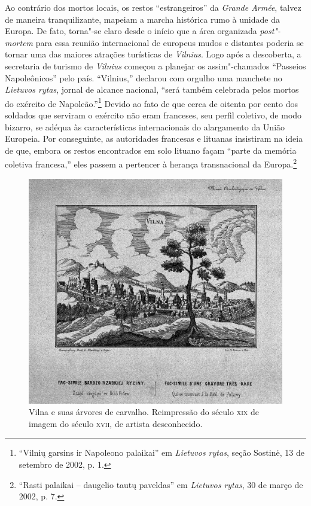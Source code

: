 Ao contrário dos mortos locais, os restos ``estrangeiros'' da
\textit{Grande Armée}, talvez de maneira tranquilizante, mapeiam a marcha
histórica rumo à unidade da Europa. De fato, torna"-se claro desde o
início que a área organizada \textit{post"-mortem} para essa reunião
internacional de europeus mudos e distantes poderia se tornar uma das
maiores atrações turísticas de \textit{Vilnius}. Logo após a descoberta, a
secretaria de turismo de \textit{Vilnius} começou a planejar os assim"-chamados
``Passeios Napoleônicos'' pelo país. ``Vilnius,'' declarou com orgulho
uma manchete no \textit{Lietuvos rytas}, jornal de alcance nacional,
``será também celebrada pelos mortos do exército de
Napoleão.''\footnote{``Vilnių garsins ir Napoleono palaikai'' em \textit{Lietuvos rytas}, seção Sostinė, 13 de setembro de 2002, p. 1.} Devido ao fato de que cerca de oitenta por cento dos soldados que
serviram o exército não eram franceses, seu perfil coletivo, de modo
bizarro, se adéqua às características internacionais do alargamento da
União Europeia. Por conseguinte, as autoridades francesas e lituanas
insistiram na ideia de que, embora os restos encontrados em solo lituano
façam ``parte da memória coletiva francesa,'' eles passem a pertencer à
herança transnacional da Europa.\footnote{``Rasti palaikai -- daugelio tautų paveldas'' em \textit{Lietuvos rytas}, 30 de março de 2002, p. 7.}


\begin{figure}[!h]
    \centering
    \includegraphics[width=\textwidth]{ilustra-11.png}
    \caption{Vilna e suas árvores de carvalho. Reimpressão do século \textsc {xix} de imagem do século \textsc {xvii}, de artista desconhecido.}
\end{figure}


